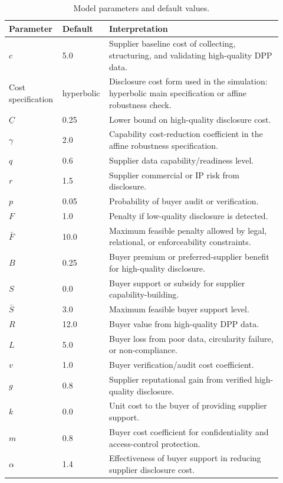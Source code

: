 \documentclass[final,5p,times,authoryear]{elsarticle}
\begin{document}
\begin{table}[t]
\centering
\begingroup
\setlength{\tabcolsep}{3pt}
\small
\caption{Model parameters and default values.}
\label{tab:model_parameters}
\begin{tabular}{@{}p{0.16\linewidth}p{0.14\linewidth}p{0.62\linewidth}@{}}
\toprule
Parameter & Default & Interpretation \\
\midrule
$c$ & 5.0 & Supplier baseline cost of collecting, structuring, and validating high-quality DPP data. \\
Cost specification & hyperbolic & Disclosure cost form used in the simulation: hyperbolic main specification or affine robustness check. \\
$\underline{C}$ & 0.25 & Lower bound on high-quality disclosure cost. \\
$\gamma$ & 2.0 & Capability cost-reduction coefficient in the affine robustness specification. \\
$q$ & 0.6 & Supplier data capability/readiness level. \\
$r$ & 1.5 & Supplier commercial or IP risk from disclosure. \\
$p$ & 0.05 & Probability of buyer audit or verification. \\
$F$ & 1.0 & Penalty if low-quality disclosure is detected. \\
$\bar{F}$ & 10.0 & Maximum feasible penalty allowed by legal, relational, or enforceability constraints. \\
$B$ & 0.25 & Buyer premium or preferred-supplier benefit for high-quality disclosure. \\
$S$ & 0.0 & Buyer support or subsidy for supplier capability-building. \\
$\bar{S}$ & 3.0 & Maximum feasible buyer support level. \\
$R$ & 12.0 & Buyer value from high-quality DPP data. \\
$L$ & 5.0 & Buyer loss from poor data, circularity failure, or non-compliance. \\
$v$ & 1.0 & Buyer verification/audit cost coefficient. \\
$g$ & 0.8 & Supplier reputational gain from verified high-quality disclosure. \\
$k$ & 0.0 & Unit cost to the buyer of providing supplier support. \\
$m$ & 0.8 & Buyer cost coefficient for confidentiality and access-control protection. \\
$\alpha$ & 1.4 & Effectiveness of buyer support in reducing supplier disclosure cost. \\

\end{tabular}
\end{table}
\end{document}
